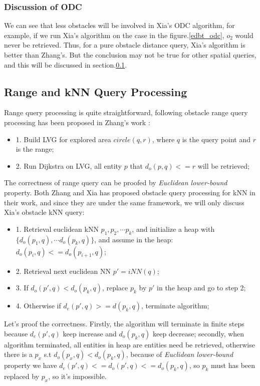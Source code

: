 \subsubsection{Discussion of ODC}
We can see that less obstacles will be involved in Xia's ODC algorithm, for example, if we run Xia's algorithm
on the case in the figure.\ref{edbt_odc}, $o_2$ would never be retrieved. Thus, for a pure obstacle
distance query, Xia's algorithm is better than Zhang's. But the conclusion may not be true for other
spatial queries, and this will be discussed in section.\ref{qp}.

\subsection{Range and kNN Query Processing}\label{qp}

Range query processing is quite straightforward, following obstacle range query processing has
been proposed in Zhang's work \cite{zhang2004spatial}:
\begin{itemize}
  \item 1. Build LVG for explored area $circle(q, r)$, where $q$ is the query point and $r$ is the range;
  \item 2. Run Dijkstra on LVG, all entity $p$ that $d_o(p, q) <= r$ will be retrieved;
\end{itemize}
The correctness of range query can be proofed by \textit{Euclidean lower-bound} property.
Both Zhang and Xia has proposed obstacle query processing for kNN in their work, and since they are under
the same framework, we will only discuss Xia's obstacle kNN query:
\begin{itemize}
  \item 1. Retrieval euclidean kNN $p_1, p_2, \cdots p_k$, and initialize a heap with \\
  $\{d_o(p_1, q), \cdots d_o(p_k, q)\}$, and assume in the heap: $d_o(p_i,q)<=d_o(p_{i+1}, q)$;
  \item 2. Retrieval next euclidean NN $p'=iNN(q)$;
  \item 3. If $d_o(p',q)<d_o(p_k, q)$, replace $p_k$ by $p'$ in the heap and go to step 2;
  \item 4. Otherwise if $d_e(p', q) >= d(p_k, q)$, terminate algorithm;
\end{itemize}
Let's proof the correctness. Firstly, the algorithm will terminate in finite steps because
$d_e(p', q)$ keep increase and $d_o(p_k, q) $ keep decrease; secondly, when algorithm
terminated, all entities in heap are entities need be retrieved, otherwise there is a $p_x$
s.t $d_o(p_x, q) < d_o(p_k, q)$, because of \textit{Euclidean lower-bound} property we have
$d_e(p', q) <= d_o(p', q) <= d_o(p_k, q)$, so $p_k$ must has been replaced by $p_x$, so it's
impossible.

